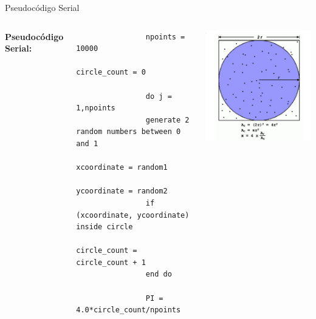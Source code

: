 \documentclass{beamer}
\begin{document}
	\begin{frame}[fragile]{Pseudocódigo Serial}
		
		\begin{columns}[T]
			\footnotesize
			\textbf{Pseudocódigo Serial:}
			\begin{verbatim}
				npoints = 10000
				circle_count = 0
				
				do j = 1,npoints
				generate 2 random numbers between 0 and 1
				xcoordinate = random1
				ycoordinate = random2
				if (xcoordinate, ycoordinate) inside circle
				circle_count = circle_count + 1
				end do
				
				PI = 4.0*circle_count/npoints
			\end{verbatim}
			
			\includegraphics[scale=0.4]{circfig.png}
		\end{columns}
	\end{frame}
	
\end{document}
